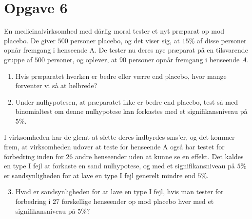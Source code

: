\section*{Opgave 6}
En medicinalvirksomhed med dårlig moral tester et nyt præparat op mod placebo. De giver $500$ personer placebo, og det viser sig, at $15\%$ af disse personer opnår fremgang i henseende A. De tester nu deres nye præparat på en tilsvarende gruppe af $500$ personer, og oplever, at $90$ personer opnår fremgang i henseende $A$. 
\begin{enumerate}[label=\roman*)]
\item Hvis præparatet hverken er bedre eller værre end placebo, hvor mange forventer vi så at helbrede?
\item Under nulhypotesen, at præparatet ikke er bedre end placebo, test så med binomialtest om denne nulhypotese kan forkastes med et signifikansniveau på $5\%$.
\end{enumerate}
I virksomheden har de glemt at slette deres indbyrdes sms'er, og det kommer frem, at virksomheden udover at teste for henseende A også har testet for forbedring inden for 26 andre henseender uden at kunne se en effekt. Det kaldes en type I fejl at forkaste en sand nulhypotese, og med et signifikansniveau på $5\%$ er sandsynligheden for at lave en type I fejl generelt mindre end $5\%$. 
\begin{enumerate}[label=\roman*)]
\setcounter{enumi}{2}
\item Hvad er sandsynligheden for at lave en type I fejl, hvis man tester for forbedring i 27 forskellige henseender op mod placebo hver med et signifikansniveau på $5\%$?
\end{enumerate}
